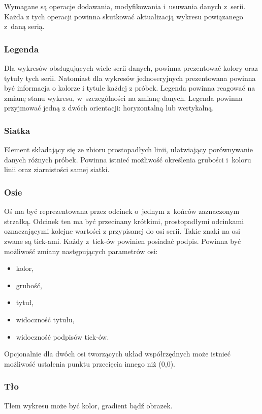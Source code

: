 \documentclass[11pt,twoside,a4paper,final]{article}
\begin{document}
Wymagane są operacje dodawania, modyfikowania i~usuwania danych z~serii. Każda z tych operacji powinna skutkować aktualizacją wykresu powiązanego z~daną serią.
  
\subsubsection{Legenda}
Dla wykresów obsługujących wiele serii danych, powinna prezentować kolory oraz tytuły tych serii.
Natomiast dla wykresów jednoseryjnych prezentowana powinna być informacja o kolorze i tytule każdej z próbek. Legenda powinna reagować na zmianę stanu wykresu, w~szczególności na zmianę danych. Legenda powinna przyjmować jedną z dwóch orientacji: horyzontalną lub wertykalną.

\subsubsection{Siatka}
Element składający się ze zbioru prostopadłych linii, ułatwiający porównywanie danych różnych próbek. Powinna istnieć możliwość określenia grubości i~koloru linii oraz ziarnistości samej siatki.

\subsubsection{Osie}
Oś ma być reprezentowana przez odcinek o~jednym z~końców zaznaczonym strzałką. Odcinek ten ma być przecinany krótkimi, prostopadłymi odcinkami oznaczającymi kolejne wartości z przypisanej do osi serii. Takie znaki na osi zwane są tick-ami. Każdy z~tick-ów powinien posiadać podpis.
Powinna być możliwość zmiany następujących parametrów osi:
\begin{itemize}
\item{kolor,}
\item{grubość,}
\item{tytuł,}
\item{widoczność tytułu,}
\item{widoczność podpisów tick-ów.}
\end{itemize}

Opcjonalnie dla dwóch osi tworzących układ współrzędnych może istnieć możliwość ustalenia punktu przecięcia innego niż (0,0). 

\subsubsection{Tło}
Tłem wykresu może być kolor, gradient bądź obrazek.
\end{document}
